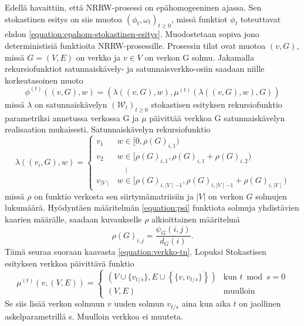\documentclass[finnish, 12pt, a4paper, sci, utf8, pdfa]{aaltothesis}
\newcommand{\Wrandom}{\mathcal{W}}
\begin{document}
Edellä havaittiin, että NRRW-prosessi on epähomogeeninen ajassa. Sen stokastinen esitys on siis muotoa \( (\phi_{t}, \omega_{t})_{t \geq 0} \), missä funktiot \( \phi_{t} \) toteuttavat ehdon \ref{equation:epahom-stokastinen-esitys}. Muodostetaan sopiva jono deterministisiä funktioita NRRW-prosessille. Prosessin tilat ovat muotoa \( (v, G) \), missä \( G = (V, E) \) on verkko ja \( v \in V \) on verkon G solmu. Jakamalla rekursiofunktiot satunnaiskävely- ja satunnaisverkko-osiin saadaan niille korkeatasoinen muoto
\begin{equation}
   \phi^{(t)} \left( (v, G), w \right) = \left( \lambda\left( (v, G), w \right), \mu^{(t)} \left( \lambda\left( (v, G), w \right), G \right) \right)
   \label{equation:esitys-1}
\end{equation}
missä \( \lambda \) on satunnaiskävelyn \( (\Wrandom_{t})_{t \geq 0} \) stokastisen esityksen rekursiofunktio parametriksi annetussa verkossa G ja \( \mu \) päivittää verkkoa G satunnaiskävelyn realisaation mukaisesti. Satunnaiskävelyn rekursiofunktio
\begin{equation}
   \lambda \left( (v_{i}, G), w \right) = 
   \begin{cases}
      v_{1} & w \in [0, \rho(G)_{i,1}) \\
      v_{2} & w \in [\rho(G)_{i,1}, \rho(G)_{i,1} + \rho(G)_{i,2}) \\
            & \quad \vdots \\
      v_{\mid V \mid} & w \in [\rho(G)_{i,\mid V \mid - 1}, \rho(G)_{i,\mid V \mid - 1} + \rho(G)_{i,\mid V \mid}) 
   \end{cases}
\end{equation}
missä \( \rho \) on funktio verkosta sen siirtymämatriisiin ja $ |V| $ on verkon $ G $ solmujen lukumäärä. Hyödyntäen määritelmän \ref{equation:psi} funktiota solmuja yhdistävien kaarien määrälle, saadaan kuvaukselle \( \rho \) alkioittainen määritelmä
\begin{equation}
   \rho(G)_{i,j} = \frac{\psi_{G}(i, j)}{d_{G}(i)}.
\end{equation}
Tämä seuraa suoraan kaavasta \ref{equation:verkko-tn}. Lopuksi Stokastisen esityksen verkkoa päivittävä funktio
\begin{equation}
   \mu^{(t)} \left( v, (V, E) \right) =
   \begin{cases}
      \left( V \cup \{v_{t/s}\}, E \cup \left\{ \{ v, v_{t/s} \} \right\} \right) & \text{kun } t \bmod s = 0 \\
      \left( V, E \right) & \text{muulloin}
   \end{cases}
   \label{equation:esitys-4}
\end{equation}
Se siis lisää verkon solmuun \( v \) uuden solmun \( v_{t/s} \) aina kun aika $ t $ on jaollinen askelparametrillä s. Muulloin verkkoa ei muuteta.
\end{document}
